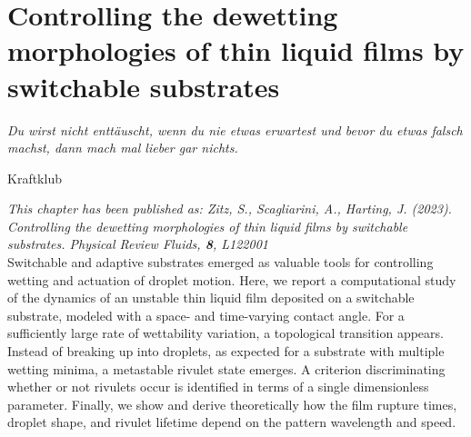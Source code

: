 \chapter{Controlling the dewetting morphologies of thin liquid films by switchable substrates}
\label{chapter:third_paper}
\epigraph{\textit{Du wirst nicht enttäuscht, wenn du nie etwas erwartest und bevor du etwas falsch machst, dann mach mal lieber gar nichts.}}{Kraftklub}

\textit{\small{This chapter has been published as: Zitz, S., Scagliarini, A., Harting, J. (2023). Controlling the dewetting morphologies of thin liquid films by switchable substrates. Physical Review Fluids, \textbf{8}, L122001}}\\

Switchable and adaptive substrates emerged as valuable tools for controlling wetting and actuation of droplet motion. 
Here, we report a computational study of the dynamics of an unstable thin liquid film deposited on a switchable substrate, modeled with a space- and time-varying contact angle. 
For a sufficiently large rate of wettability variation, a topological transition appears. 
Instead of breaking up into droplets, as expected for a substrate with multiple wetting minima, a metastable rivulet state emerges. 
A criterion discriminating whether or not rivulets occur is identified in terms of a single dimensionless parameter. 
Finally, we show and derive theoretically how the film rupture times, droplet shape, and rivulet lifetime depend on the pattern wavelength and speed.
\\
\newcommand{\ts}{\textsuperscript}

